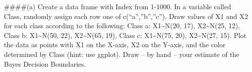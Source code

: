 \documentclass[]{article}
\newenvironment{Shaded}{\begin{snugshade}}{\end{snugshade}}
\newcommand{\ControlFlowTok}[1]{\textcolor[rgb]{0.13,0.29,0.53}{\textbf{#1}}}
\newcommand{\DataTypeTok}[1]{\textcolor[rgb]{0.13,0.29,0.53}{#1}}
\newcommand{\DecValTok}[1]{\textcolor[rgb]{0.00,0.00,0.81}{#1}}
\newcommand{\KeywordTok}[1]{\textcolor[rgb]{0.13,0.29,0.53}{\textbf{#1}}}
\newcommand{\NormalTok}[1]{#1}
\newcommand{\OperatorTok}[1]{\textcolor[rgb]{0.81,0.36,0.00}{\textbf{#1}}}
\newcommand{\OtherTok}[1]{\textcolor[rgb]{0.56,0.35,0.01}{#1}}
\newcommand{\StringTok}[1]{\textcolor[rgb]{0.31,0.60,0.02}{#1}}
\begin{document}
\#\#\#\#(a) Create a data frame with Index from 1-1000. In a variable
called Class, randomly assign each row one of c(``a'',''b'',''c''). Draw
values of X1 and X2 for each class according to the following: Class a:
X1\textasciitilde N(20, 17), X2\textasciitilde N(25, 12), Class b:
X1\textasciitilde N(50, 22), X2\textasciitilde N(65, 19), Class c:
X1\textasciitilde N(75, 20), X2\textasciitilde N(27, 15). Plot the data
as points with X1 on the X-axis, X2 on the Y-axis, and the color
determined by Class (hint: use ggplot). Draw -- by hand -- your estimate
of the Bayes Decision Boundaries.

\begin{Shaded}
\end{Shaded}
\end{document}
